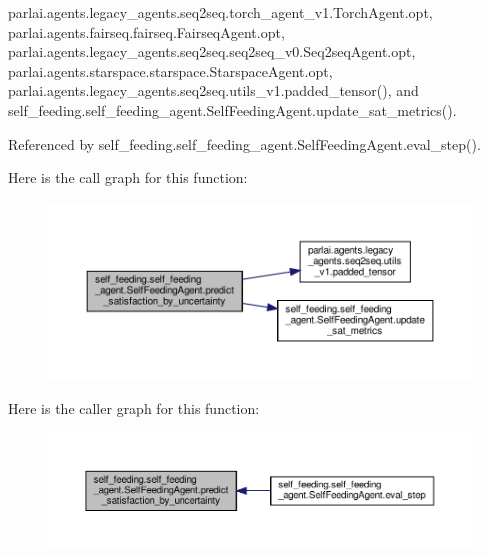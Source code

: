 parlai.\+agents.\+legacy\+\_\+agents.\+seq2seq.\+torch\+\_\+agent\+\_\+v1.\+Torch\+Agent.\+opt, parlai.\+agents.\+fairseq.\+fairseq.\+Fairseq\+Agent.\+opt, parlai.\+agents.\+legacy\+\_\+agents.\+seq2seq.\+seq2seq\+\_\+v0.\+Seq2seq\+Agent.\+opt, parlai.\+agents.\+starspace.\+starspace.\+Starspace\+Agent.\+opt, parlai.\+agents.\+legacy\+\_\+agents.\+seq2seq.\+utils\+\_\+v1.\+padded\+\_\+tensor(), and self\+\_\+feeding.\+self\+\_\+feeding\+\_\+agent.\+Self\+Feeding\+Agent.\+update\+\_\+sat\+\_\+metrics().



Referenced by self\+\_\+feeding.\+self\+\_\+feeding\+\_\+agent.\+Self\+Feeding\+Agent.\+eval\+\_\+step().

Here is the call graph for this function\+:
\nopagebreak
\begin{figure}[H]
\begin{center}
\leavevmode
\includegraphics[width=350pt]{classself__feeding_1_1self__feeding__agent_1_1SelfFeedingAgent_a9613b626ec2e4bbdeca8b1decc9d7513_cgraph}
\end{center}
\end{figure}
Here is the caller graph for this function\+:
\nopagebreak
\begin{figure}[H]
\begin{center}
\leavevmode
\includegraphics[width=350pt]{classself__feeding_1_1self__feeding__agent_1_1SelfFeedingAgent_a9613b626ec2e4bbdeca8b1decc9d7513_icgraph}
\end{center}
\end{figure}
\mbox{\label{classself__feeding_1_1self__feeding__agent_1_1SelfFeedingAgent_a0731b4f9dc3e9763fbccaf48e531f3c6}} 
